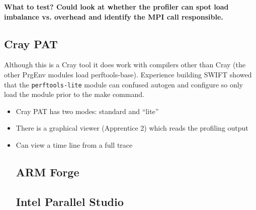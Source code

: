 \documentclass[a4paper,titlepage]{article}
\begin{document}
\textbf{What to test? Could look at whether the profiler can spot load imbalance vs. overhead and identify the MPI call responsible.}

\subsection{Cray PAT}

Although this is a Cray tool it does work with compilers other than Cray (the other PrgEnv modules load perftools-base). Experience building SWIFT showed that the \texttt{perftools-lite} module can confused autogen and configure so only load the module prior to the make command. 

\begin{itemize}
\item Cray PAT has two modes: standard and ``lite''
\item There is a graphical viewer (Apprentice 2) which reads the profiling output
\item Can view a time line from a full trace

\subsection{ARM Forge}

\subsection{Intel Parallel Studio}

\end{itemize}
\end{document}
